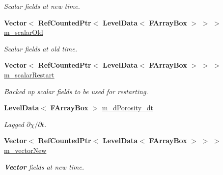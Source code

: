\begin{DoxyCompactItemize}
\begin{DoxyCompactList}\small\item\em Scalar fields at new time. \end{DoxyCompactList}\item 
\mbox{\label{class_a_m_r_level_mushy_layer_ac46148c3e276d617167713088ffe0599}} 
\textbf{ Vector}$<$ \textbf{ Ref\+Counted\+Ptr}$<$ \textbf{ Level\+Data}$<$ \textbf{ F\+Array\+Box} $>$ $>$ $>$ \hyperlink{class_a_m_r_level_mushy_layer_ac46148c3e276d617167713088ffe0599}{m\+\_\+scalar\+Old}
\begin{DoxyCompactList}\small\item\em Scalar fields at old time. \end{DoxyCompactList}\item 
\mbox{\label{class_a_m_r_level_mushy_layer_a05741bcf973b908f3defe7aa3de6dcc8}} 
\textbf{ Vector}$<$ \textbf{ Ref\+Counted\+Ptr}$<$ \textbf{ Level\+Data}$<$ \textbf{ F\+Array\+Box} $>$ $>$ $>$ \hyperlink{class_a_m_r_level_mushy_layer_a05741bcf973b908f3defe7aa3de6dcc8}{m\+\_\+scalar\+Restart}
\begin{DoxyCompactList}\small\item\em Backed up scalar fields to be used for restarting. \end{DoxyCompactList}\item 
\mbox{\label{class_a_m_r_level_mushy_layer_a29bc16b92f683fa1006932cdc417b9f5}} 
\textbf{ Level\+Data}$<$ \textbf{ F\+Array\+Box} $>$ \hyperlink{class_a_m_r_level_mushy_layer_a29bc16b92f683fa1006932cdc417b9f5}{m\+\_\+d\+Porosity\+\_\+dt}
\begin{DoxyCompactList}\small\item\em Lagged $ \partial \chi / \partial t $. \end{DoxyCompactList}\item 
\mbox{\label{class_a_m_r_level_mushy_layer_a3532d7906fe5e9bbdb42e6b861bd6f32}} 
\textbf{ Vector}$<$ \textbf{ Ref\+Counted\+Ptr}$<$ \textbf{ Level\+Data}$<$ \textbf{ F\+Array\+Box} $>$ $>$ $>$ \hyperlink{class_a_m_r_level_mushy_layer_a3532d7906fe5e9bbdb42e6b861bd6f32}{m\+\_\+vector\+New}
\begin{DoxyCompactList}\small\item\em \textbf{ Vector} fields at new time. \end{DoxyCompactList}\item 

\end{DoxyCompactItemize}

